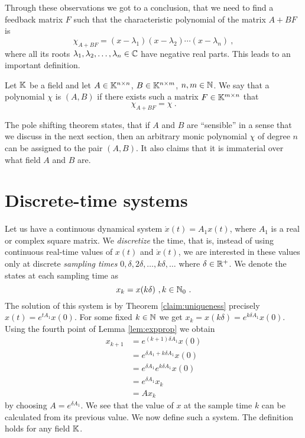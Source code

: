 Through these observations we got to a conclusion, that we need to find a feedback matrix $F$ such that the characteristic polynomial of the matrix $A+BF$ is $$\chi_{A+BF}=(x-\lambda_1)(x-\lambda_2)\cdots(x-\lambda_n)\ ,$$ where all its roots $\lambda_1,\lambda_2,\ldots,\lambda_n \in \mathbb{C}$ have negative real parts. This leads to an important definition.

\begin{definition}
    Let $\mathbb{K}$ be a field and let $A \in \mathbb{K}^{n \times n}$, $B \in \mathbb{K}^{n \times m}$, $n,m \in \mathbb{N}$. We say that a polynomial $\chi$ is  $(A,B)$ if there exists such a matrix $F\in\mathbb{K}^{m \times n}$ that $$\chi_{A+BF}=\chi\ .$$
\end{definition}

The pole shifting theorem states, that if $A$ and $B$ are ``sensible'' in a sense that we discuss in the next section, then an arbitrary monic polynomial $\chi$ of degree $n$ can be assigned to the pair $(A,B)$. It also claims that it is immaterial over what field $A$ and $B$ are.

\section{Discrete-time systems}

Let us have a continuous dynamical system $\dot{x}(t)=A_1x(t)$, where $A_1$ is a real or complex square matrix. We \textit{discretize} the time, that is, instead of using continuous real-time values of $x(t)$ and $\dot{x}(t)$, we are interested in these values only at discrete \textit{sampling times} $0,\delta,2\delta,\ldots,k\delta,\ldots$ where $\delta\in\mathbb{R}^+$. We denote the states at each sampling time as
$$x_k=x(k\delta)\ ,k\in\mathbb{N}_0\ .$$
The solution of this system is by Theorem \ref{claim:uniqueness} precisely $x(t)=e^{tA_1}x(0)$. For some fixed $k\in\mathbb{N}$ we get $x_k=x(k\delta)=e^{k\delta A_1}x(0)$. Using the fourth point of Lemma \ref{lem:expprop} we obtain 
\begin{align*}
	x_{k+1}
	&=e^{(k+1)\delta A_1}x(0) \\
	&=e^{\delta A_1 +k\delta A_1}x(0) \\
	&=e^{\delta A_1}e^{k\delta A_1}x(0) \\
	&=e^{\delta A_1}x_k \\
	&=Ax_k
\end{align*}
by choosing $A=e^{\delta A_1}$. We see that the value of $x$ at the sample time $k$ can be calculated from its previous value. We now define such a system. The definition holds for any field $\mathbb{K}$.

